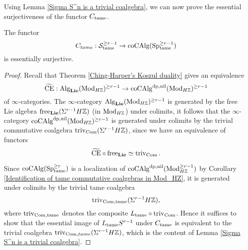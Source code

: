 Using Lemma \ref{Sigma S^n is a trivial coalgebra}, we can now prove the essential surjectiveness of the functor $C_{\tame}$.
\begin{lemma}
\label{Essential Surjectivity of C_tame}
	The functor 
	$$
	C_{tame}: \CS^{\geq r-1}_{\tame}  
	\to 
	\coCAlg(\Sp^{\geq r-1}_{\tame})
	$$
	is essentially surjective.
\end{lemma}
\begin{proof}
Recall that Theorem \ref{Ching-Harper's Koszul duality}
gives an equivalence
$$
\tildeCE: \Alg_{\spLie}(\Mod_{H\BZ})^{\geq r-1} \to \coCAlg^{\divpow, \nil}(\Mod_{H\BZ})^{\geq r-1}
$$
of $\infty$-categories. The $\infty$-category $\Alg_{\spLie}(\Mod_{H\BZ})^{\geq r-1}$ is generated by the free Lie algebra $\Free_{\spLie}(\Sigma^{r-1} H\BZ)$ (in $\Mod_{H\BZ}$) under colimits,
 it follows that the $\infty$-category $\coCAlg^{\divpow, \nil}(\Mod_{H\BZ})^{\geq r-1}$ is generated under colimits by the trivial commutative coalgebra $\trivial_{\Com}(\Sigma^{r-1}H \BZ)$, since we have an equivalence of functors
$$
\tildeCE \circ \Free_{\spLie} \simeq \trivial_{\Com}.
$$

Since $\coCAlg(\Sp^{\geq r}_{\tame})$ is
a localization of $\coCAlg^{\divpow, \nil}(\Mod_{H\BZ}^{\geq r-1})$ by Corollary \ref{Identification of tame commutative coalgebras in Mod_HZ},
it is generated under colimits by the trivial tame coalgebra 
$$
\trivial_{\Com,\tame}(\Sigma^{r-1}H \BZ),
$$ 
where $\trivial_{\Com,\tame}$ denotes the composite $L_{\tame}\circ \trivial_{\Com}$.
Hence it suffices to show that the essential image of $L_{\tame}S^{r-1}$ under $C_{\tame}$ is equivalent to the trivial coalgebra $\trivial_{\Com,tame}(\Sigma^{r-1}H \BZ)$, which is the content of Lemma \ref{Sigma S^n is a trivial coalgebra}.

\end{proof}







